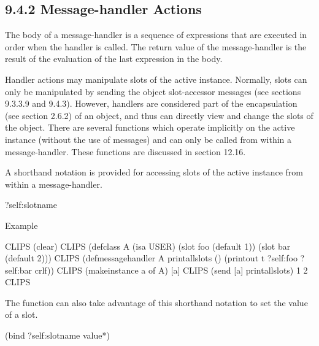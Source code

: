 \documentclass[letterpaper,10pt,english]{sphinxmanual}
\begin{document}
\subsection{9.4.2 Message-handler Actions}
\label{\detokenize{cool:message-handler-actions}}
The body of a message-handler is a sequence of expressions that are
executed in order when the handler is called. The return value of the
message-handler is the result of the evaluation of the last expression
in the body.

Handler actions may  manipulate slots of the active instance.
Normally, slots can only be manipulated by sending the object
slot-accessor messages (see sections 9.3.3.9 and 9.4.3). However,
handlers are considered part of the encapsulation (see section 2.6.2) of
an object, and thus can directly view and change the slots of the
object. There are several functions which operate implicitly on the
active instance (without the use of messages) and can only be called
from within a message-handler. These functions are discussed in section
12.16.

A shorthand notation is provided for accessing slots of the active
instance from within a message-handler.


\begin{sphinxVerbatim}[commandchars=\\\{\}]
?self:\PYGZlt{}slot\PYGZhy{}name\PYGZgt{}
\end{sphinxVerbatim}

Example

\begin{sphinxVerbatim}[commandchars=\\\{\}]
CLIPS\PYGZgt{} (clear)
CLIPS\PYGZgt{}
(defclass A (is\PYGZhy{}a USER)
  (slot foo (default 1))
  (slot bar (default 2)))
CLIPS\PYGZgt{}
(defmessage\PYGZhy{}handler A print\PYGZhy{}all\PYGZhy{}slots ()
  (printout t ?self:foo \PYGZdq{} \PYGZdq{} ?self:bar crlf))
CLIPS\PYGZgt{} (make\PYGZhy{}instance a of A)
[a]
CLIPS\PYGZgt{} (send [a] print\PYGZhy{}all\PYGZhy{}slots)
1 2
CLIPS\PYGZgt{}
\end{sphinxVerbatim}

The  function can also take advantage of this shorthand notation
to set the value of a slot.


\begin{sphinxVerbatim}[commandchars=\\\{\}]
(bind ?self:\PYGZlt{}slot\PYGZhy{}name\PYGZgt{} \PYGZlt{}value\PYGZgt{}*)
\end{sphinxVerbatim}
\end{document}
